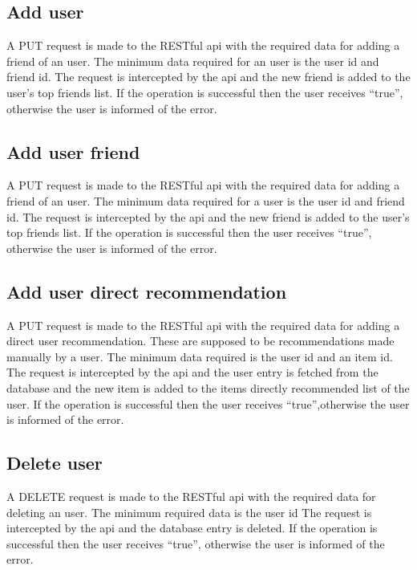 \subsection{Add user}
\label{sec:workflow-add-user}
A PUT request is made to the RESTful api with the required data for adding a friend of an user.
The minimum data required for an user is the user id and friend id.
The request is intercepted by the api and the new friend is added to the user’s top friends list. If the operation is successful then the user receives “true”, otherwise the user is informed of the error. 

\subsection{Add user friend}
\label{sec:workflow-add-user-friend}
A PUT request is made to the RESTful api with the required data for adding a friend of an user.
The minimum data required for a user is the user id and friend id.
The request is intercepted by the api and the new friend is added to the user’s top friends list. If the operation is successful then the user receives “true”, otherwise the user is informed of the error. 

\subsection{Add user direct recommendation}
\label{sec:workflow-add-user-direct-recommendation}
A PUT request is made to the RESTful api with the required data for adding a direct user recommendation.
These are supposed to be recommendations made manually by a user.
The minimum data required is the user id and an item id.
The request is intercepted by the api and the user entry is fetched from the database and the new item is added to the items directly recommended list of the user. If the operation is successful then the user receives “true”,otherwise the user is informed of the error. 

\subsection{Delete user}
\label{sec:workflow-delete-user}
A DELETE request is made to the RESTful api with the required data for deleting an user.
The minimum required data is the user id
The request is intercepted by the api and the database entry is deleted. If the operation is successful then the user receives “true”, otherwise the user is informed of the error. 

